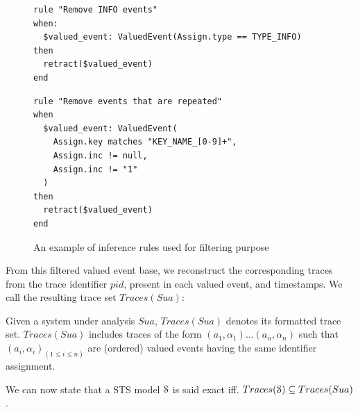 \begin{figure}[ht]
\begin{framed}
\begin{BVerbatim}
rule "Remove INFO events"
when:
  $valued_event: ValuedEvent(Assign.type == TYPE_INFO)
then
  retract($valued_event)
end
\end{BVerbatim}
\end{framed}

\begin{framed}
\begin{BVerbatim}
rule "Remove events that are repeated"
when
  $valued_event: ValuedEvent(
    Assign.key matches "KEY_NAME_[0-9]+",
    Assign.inc != null,
    Assign.inc != "1"
  )
then
  retract($valued_event)
end
\end{BVerbatim}
\end{framed}

\caption{An example of inference rules used for filtering purpose}
\label{fig:removalrules}
\end{figure}

From this filtered valued event base, we reconstruct the
corresponding traces from the trace identifier $pid$, present in
each valued event, and timestamps. We call the resulting trace
set $Traces(Sua)$:

\begin{definition}
    Given a system under analysis $\mathit{Sua}$, $Traces(Sua)$ denotes
    its formatted trace set. $Traces(Sua)$ includes traces of the
    form $(a_1,\alpha_1) \dots (a_n,\alpha_n)$ such that
    $(a_i,\alpha_i)_{(1 \leq i \leq n)}$ are (ordered) valued
    events having the same identifier assignment.

	\label{def:structuredtrace}
\end{definition}

We can now state that a STS model $\EuScript{S}$ is said exact
iff. $Traces(\EuScript{S}) \subseteq Traces(Sua)$.

